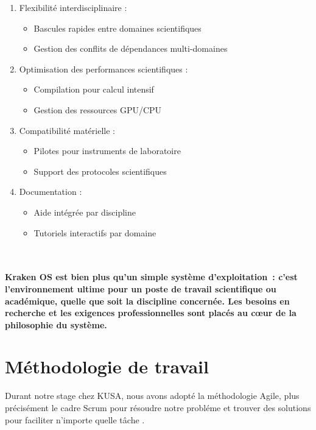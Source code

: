 \begin{itemize}[leftmargin=*,nosep]
\begin{enumerate}[label=\alph*)]
\item Flexibilité interdisciplinaire :
\begin{itemize}
\item Bascules rapides entre domaines scientifiques
\item Gestion des conflits de dépendances multi-domaines
\end{itemize}

\item Optimisation des performances scientifiques :
\begin{itemize}
\item Compilation pour calcul intensif
\item Gestion des ressources GPU/CPU
\end{itemize}

\item Compatibilité matérielle :
\begin{itemize}
\item Pilotes pour instruments de laboratoire
\item Support des protocoles scientifiques
\end{itemize}

\item Documentation :
\begin{itemize}
\item Aide intégrée par discipline
\item Tutoriels interactifs par domaine \\ 
 \\ 
 \\
\end{itemize}
\end{enumerate}


\textbf{
Kraken OS est bien plus qu’un simple système d’exploitation : c’est l’environnement ultime pour un poste de travail scientifique ou académique, quelle que soit la discipline concernée. Les besoins en recherche et les exigences professionnelles sont placés au cœur de la philosophie du système.
}







\section{Méthodologie de travail}
Durant notre stage chez KUSA, nous avons adopté la méthodologie Agile, plus précisément le cadre Scrum pour résoudre notre probléme et trouver des solutions pour faciliter n'importe quelle tâche . 


\end{itemize}
